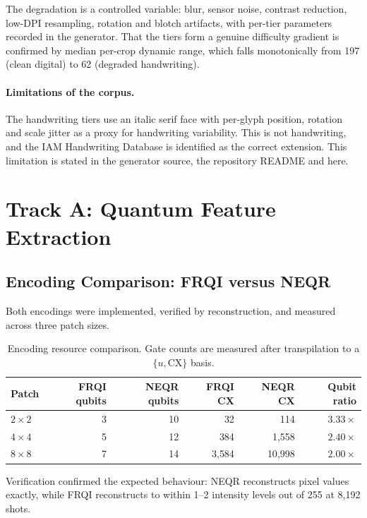 \documentclass[11pt,a4paper]{article}
\begin{document}
The degradation is a controlled variable: blur, sensor noise, contrast
reduction, low-DPI resampling, rotation and blotch artifacts, with per-tier
parameters recorded in the generator. That the tiers form a genuine difficulty
gradient is confirmed by median per-crop dynamic range, which falls
monotonically from 197 (clean digital) to 62 (degraded handwriting).

\paragraph{Limitations of the corpus.} The handwriting tiers use an italic serif
face with per-glyph position, rotation and scale jitter as a proxy for
handwriting variability. This is not handwriting, and the IAM Handwriting
Database is identified as the correct extension. This limitation is stated in
the generator source, the repository README and here.

\section{Track A: Quantum Feature Extraction}

\subsection{Encoding Comparison: FRQI versus NEQR}
\label{sec:encoding}

Both encodings were implemented, verified by reconstruction, and measured across
three patch sizes.

\begin{table}[h]
\centering
\caption{Encoding resource comparison. Gate counts are measured after
transpilation to a $\{u, \mathrm{CX}\}$ basis.}
\begin{tabular}{@{}lrrrrr@{}}
\toprule
Patch & FRQI qubits & NEQR qubits & FRQI CX & NEQR CX & Qubit ratio \\
\midrule
$2\times2$ & 3 & 10 & 32 & 114 & $3.33\times$ \\
$4\times4$ & 5 & 12 & 384 & 1{,}558 & $2.40\times$ \\
$8\times8$ & 7 & 14 & 3{,}584 & 10{,}998 & $2.00\times$ \\
\bottomrule
\end{tabular}
\end{table}

Verification confirmed the expected behaviour: NEQR reconstructs pixel values
exactly, while FRQI reconstructs to within 1--2 intensity levels out of 255 at
8{,}192 shots.
\end{document}
